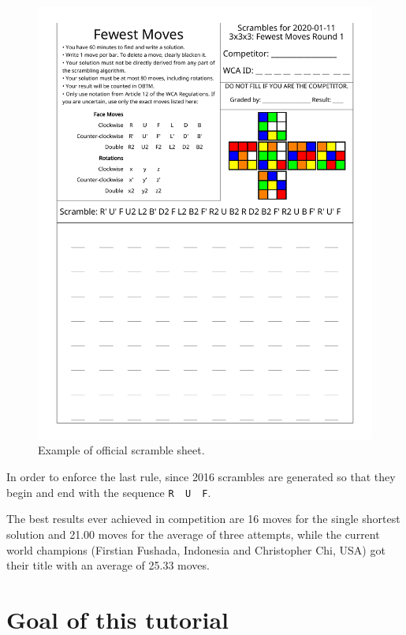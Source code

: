 \documentclass[11pt,a4paper]{book}
\newcommand{\p}{\textquotesingle}
\newcommand{\m}{\texttt}
\newcommand{\ps}{\p\,\,}
\begin{document}
\begin{figure}
\begin{center}
\includegraphics[scale=0.7]{img/example.pdf}
\end{center}
\caption{Example of official scramble sheet.}
\end{figure}

In order to enforce the last rule, since 2016 scrambles are generated so that they begin and end with the sequence \m{R\ps U\ps F}.

The best results ever achieved in competition are 16 moves for the single shortest solution and 21.00 moves for the average of three attempts, while the current world champions (Firstian Fushada, Indonesia and Christopher Chi, USA) got their title with an average of 25.33 moves.

\section*{Goal of this tutorial}
\end{document}
